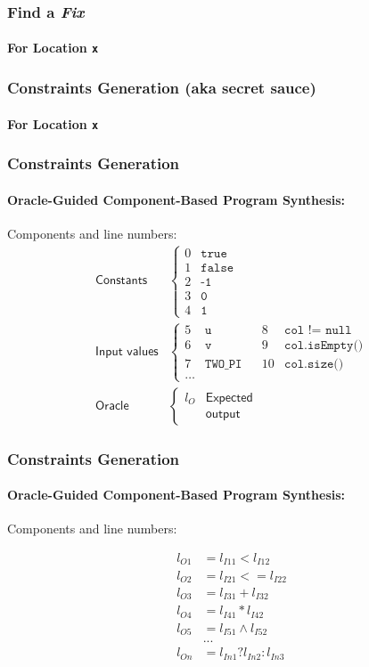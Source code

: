 \frame
{
  \frametitle{Find a \textit{Fix}}
  \framesubtitle{For Location \texttt{x}}
  \begin{center}
  
  \end{center}
}

\frame
{
  \frametitle{Constraints Generation (aka secret sauce)}
  \framesubtitle{For Location \texttt{x}}
  \begin{center}
  
  \end{center}
}

\begin{frame}
  \frametitle{Constraints Generation}
  \framesubtitle{Oracle-Guided Component-Based Program Synthesis:}
  Components and line numbers:
\begin{align*}
\textsf{Constants} & \left\{ \begin{array}{ll}
        0 & \texttt{true} \\
        1 & \texttt{false} \\
        2 & \texttt{-1} \\
        3 & \texttt{0} \\
        4 & \texttt{1}
    \end{array}\right. \\
\textsf{Input values} & \left\{ \begin{array}{lllll}
        5 & \texttt{u} & &		8 & \texttt{col != null} \\
        6 & \texttt{v} & &		9 & \texttt{col.isEmpty()} \\
        7 & \texttt{TWO\_PI} & &	10 & \texttt{col.size()} \\
        \dots
    \end{array}\right. \\
\textsf{Oracle} & \left\{ \begin{array}{ll}
        l_O &  \textsf{Expected} \\
            & \textsf{output}
    \end{array}\right.
\end{align*}
\end{frame}


\begin{frame}
  \frametitle{Constraints Generation}
  \framesubtitle{Oracle-Guided Component-Based Program Synthesis:}
  Components and line numbers:
  
\begin{align*}
l_{O1} & = l_{I11} < l_{I12} \\
l_{O2} & = l_{I21} <= l_{I22} \\ 
l_{O3} & = l_{I31} + l_{I32} \\
l_{O4} & = l_{I41} * l_{I42} \\
l_{O5} & = l_{I51} \wedge l_{I52} \\
& ... \\
l_{On} & = l_{In1} ? l_{In2} : l_{In3}
\end{align*}
\end{frame}

